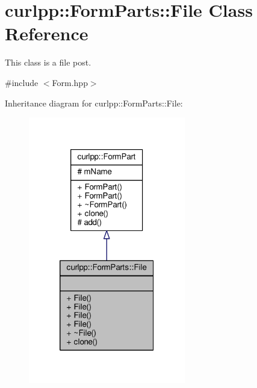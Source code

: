 \hypertarget{classcurlpp_1_1FormParts_1_1File}{\section{curlpp\-:\-:Form\-Parts\-:\-:File Class Reference}
\label{classcurlpp_1_1FormParts_1_1File}
}


This class is a file post.  




{\ttfamily \#include $<$Form.\-hpp$>$}



Inheritance diagram for curlpp\-:\-:Form\-Parts\-:\-:File\-:
\nopagebreak
\begin{figure}[H]
\begin{center}
\leavevmode
\includegraphics[width=194pt]{classcurlpp_1_1FormParts_1_1File__inherit__graph}
\end{center}
\end{figure}


